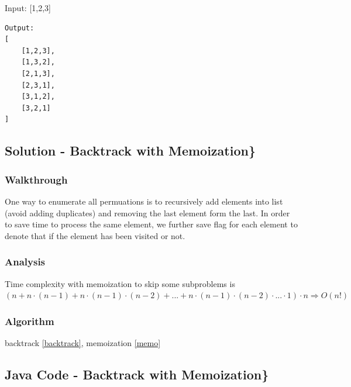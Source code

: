 \documentclass[]{book}
\begin{document}
Input: {[}1,2,3{]}

\begin{verbatim}
Output:
[
    [1,2,3],
    [1,3,2],
    [2,1,3],
    [2,3,1],
    [3,1,2],
    [3,2,1]
]
\end{verbatim}

\hypertarget{solution---backtrack-with-memoization}{%
\subsection{Solution - Backtrack with Memoization\}}\label{solution---backtrack-with-memoization}}

\hypertarget{walkthrough-13}{%
\subsubsection{Walkthrough}\label{walkthrough-13}}

One way to enumerate all permuations is to recursively add elements into list (avoid adding duplicates) and removing
the last element form the last. In order to save time to process the same element, we further save flag for each element
to denote that if the element has been visited or not.

\hypertarget{analysis-15}{%
\subsubsection{Analysis}\label{analysis-15}}

Time complexity with memoization to skip some subproblems is
\((n + n\cdot (n - 1) + n\cdot (n - 1)\cdot (n - 2) + ... + n\cdot (n - 1)\cdot (n - 2)\cdot ...\cdot 1) \cdot n \Rightarrow O(n!)\)

\hypertarget{algorithm-15}{%
\subsubsection{Algorithm}\label{algorithm-15}}

backtrack \ref{backtrack}, memoization \ref{memo}

\hypertarget{java-code---backtrack-with-memoization}{%
\subsection{Java Code - Backtrack with Memoization\}}\label{java-code---backtrack-with-memoization}}
\end{document}
